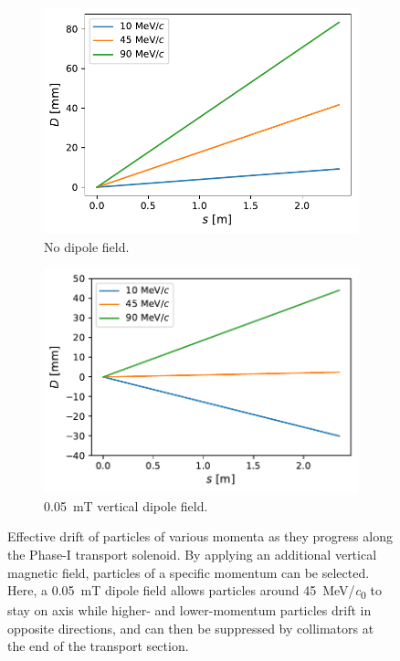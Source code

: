 \begin{figure}
    \centering
    \begin{subfigure}[b]{0.46\textwidth}
        \centering
        \hspace{-0.8cm}
        \includegraphics[width=\textwidth]{chapter2/drift_vs_s_0mT.pdf}
        \caption{No dipole field.}
    \end{subfigure}
    \hfill
    \begin{subfigure}[b]{0.46\textwidth}
        \centering
        \hspace{-0.8cm}
        \includegraphics[width=\textwidth]{chapter2/drift_vs_s_0.05mT.pdf}
        \caption{\SI{0.05}{\milli\tesla} vertical dipole field.}
    \end{subfigure}
    \caption{ Effective drift of particles of various momenta as they progress
        along the Phase-I transport solenoid. By applying an additional vertical
        magnetic field, particles of a specific momentum can be selected. Here,
        a \SI{0.05}{\milli\tesla} dipole field allows particles around
        \SI{45}{\MeV/\clight} to stay on axis while higher- and lower-momentum
        particles drift in opposite directions, and can then be suppressed by
        collimators at the end of the transport section. }
    \label{fig:drift}
\end{figure}

